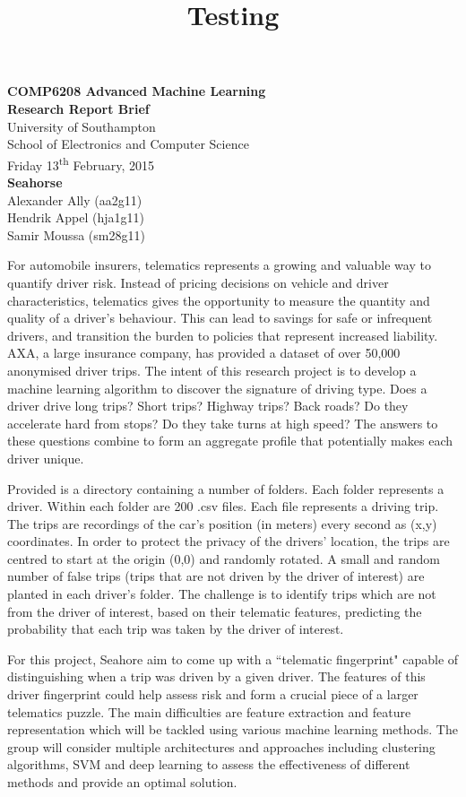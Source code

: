 \documentclass[11pt, a4paper, titlepage]{article}
\title{Testing}
\begin{document}
\begin{center}
{\Large \textbf{COMP6208 Advanced Machine Learning\\Research Report Brief}}\\
\vspace{0.7cm}
University of Southampton\\
School of Electronics and Computer Science\\
Friday 13\textsuperscript{th} February, 2015\\
\vspace{0.7cm}
\textbf{{\large Seahorse}}\\
Alexander Ally (aa2g11)\\
Hendrik Appel (hja1g11)\\
Samir Moussa (sm28g11)
\end{center}

For automobile insurers, telematics represents a growing and valuable way to quantify driver risk. Instead of pricing decisions on vehicle and driver characteristics, telematics gives the opportunity to measure the quantity and quality of a driver's behaviour. This can lead to savings for safe or infrequent drivers, and transition the burden to policies that represent increased liability. AXA, a large insurance company, has provided a dataset of over 50,000 anonymised driver trips. The intent of this research project is to develop a machine learning algorithm to discover the signature of driving type. Does a driver drive long trips? Short trips? Highway trips? Back roads? Do they accelerate hard from stops? Do they take turns at high speed? The answers to these questions combine to form an aggregate profile that potentially makes each driver unique.

Provided is a directory containing a number of folders. Each folder represents a driver. Within each folder are 200 .csv files. Each file represents a driving trip. The trips are recordings of the car's position (in meters) every second as (x,y) coordinates. In order to protect the privacy of the drivers' location, the trips are centred to start at the origin (0,0) and randomly rotated. A small and random number of false trips (trips that are not driven by the driver of interest) are planted in each driver's folder. The challenge is to identify trips which are not from the driver of interest, based on their telematic features, predicting the probability that each trip was taken by the driver of interest.

For this project, Seahore aim to come up with a ``telematic fingerprint" capable of distinguishing when a trip was driven by a given driver. The features of this driver fingerprint could help assess risk and form a crucial piece of a larger telematics puzzle. The main difficulties are feature extraction and feature representation which will be tackled using various machine learning methods. The group will consider multiple architectures and approaches including clustering algorithms, SVM and deep learning to assess the effectiveness of different methods and provide an optimal solution.
\end{document}
